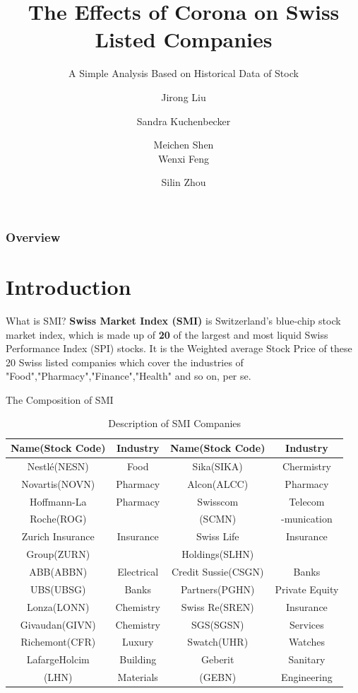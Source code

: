 \documentclass{beamer}
\title[Corona's Effetcs] %
{The Effects of Corona on Swiss Listed Companies}
\subtitle{A Simple Analysis Based on Historical Data of Stock   }
\author[Digital Tools for Finance] %
{Jirong Liu \and Sandra Kuchenbecker \and Meichen Shen\\
 Wenxi Feng \and Silin Zhou}
\date[ December 2020] %
\begin{document}
\maketitle

\begin{frame}
\frametitle{Overview}
\tableofcontents


\end{frame}
\section{Introduction}
\begin{frame}{What is SMI?}
\textbf{Swiss Market Index (SMI)} is Switzerland's blue-chip stock market index, which is  made up of \textbf{20} of the largest and most liquid Swiss Performance Index (SPI) stocks. It is the Weighted average Stock Price of these 20 Swiss listed companies which cover the industries of "Food","Pharmacy","Finance","Health" and so on, per se.
\end{frame}

\begin{frame}{The Composition of SMI}
\begin{table}[!htbp]
    \centering
    \begin{tabular}{|c|c|c|c|} \hline
   Name(Stock Code)& Industry & Name(Stock Code) & Industry \\ \hline
   Nestlé(NESN)   & Food &  Sika(SIKA) & Chermistry \\ \hline
    Novartis(NOVN) & Pharmacy & Alcon(ALCC) & Pharmacy \\ \hline
    Hoffmann-La & Pharmacy & Swisscom & Telecom \\ 
    Roche(ROG) & &(SCMN) &-munication \\ \hline
    Zurich Insurance& Insurance & Swiss Life & Insurance\\ 
    Group(ZURN) & &Holdings(SLHN) &\\ \hline
    ABB(ABBN) & Electrical & Credit Sussie(CSGN) &  Banks \\ \hline
    UBS(UBSG) & Banks  & Partners(PGHN) &  Private Equity \\ \hline
    Lonza(LONN) & Chemistry  & Swiss Re(SREN) & Insurance  \\ \hline
    Givaudan(GIVN) & Chemistry & SGS(SGSN)  &  Services \\ \hline
    Richemont(CFR) & Luxury & Swatch(UHR) &  Watches \\ \hline
    LafargeHolcim & Building & Geberit & Sanitary \\ 
    (LHN) & Materials & (GEBN) & Engineering\\ \hline
    
    \end{tabular}
    \caption{Description of SMI Companies}
    \label{tab:my_label}
\end{table}

\end{frame}
\end{document}
